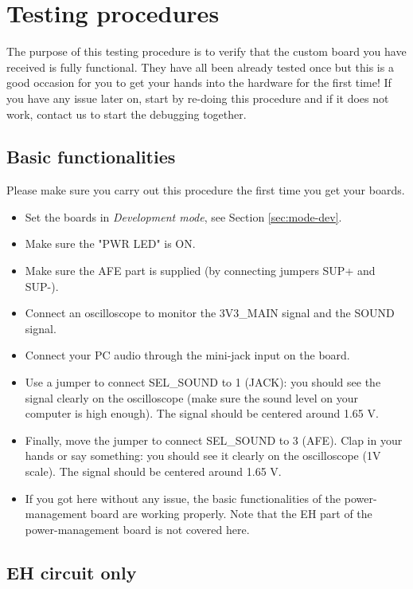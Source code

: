 \section{Testing procedures} \label{sec:test}

The purpose of this testing procedure is to verify that the custom board you have received is fully functional. They have all been already tested once but this is a good occasion for you to get your hands into the hardware for the first time! If you have any issue later on, start by re-doing this procedure and if it does not work, contact us to start the debugging together.

\subsection{Basic functionalities}

Please make sure you carry out this procedure the first time you get your boards.

\begin{itemize}
    \item Set the boards in \textit{Development mode}, see Section \ref{sec:mode-dev}.
    \item Make sure the "PWR LED" is ON.
    \item Make sure the AFE part is supplied (by connecting jumpers SUP+ and SUP-).
    \item Connect an oscilloscope to monitor the 3V3\_MAIN signal and the SOUND signal.
    \item Connect your PC audio through the mini-jack input on the board.
    \item Use a jumper to connect SEL\_SOUND to 1 (JACK): you should see the signal clearly on the oscilloscope (make sure the sound level on your computer is high enough). The signal should be centered around 1.65 V.
    \item Finally, move the jumper to connect SEL\_SOUND to 3 (AFE). Clap in your hands or say something: you should see it clearly on the oscilloscope (1V scale). The signal should be centered around 1.65 V.
    \item If you got here without any issue, the basic functionalities of the power-management board are working properly. Note that the EH part of the power-management board is not covered here.
\end{itemize}


\subsection{EH circuit only}

